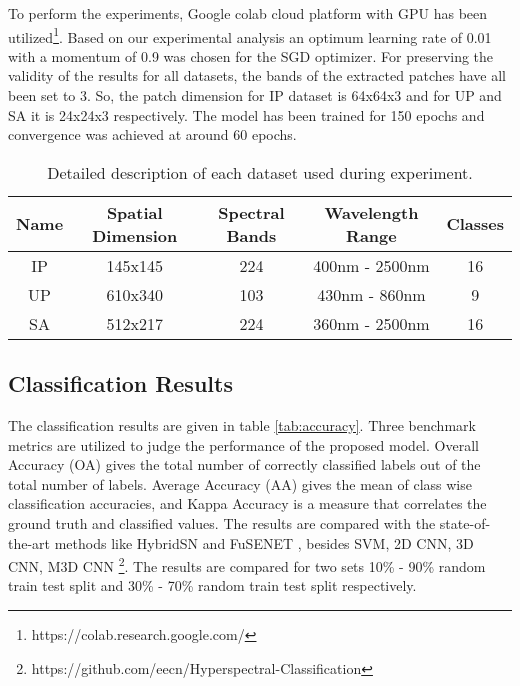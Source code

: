 \documentclass[journal]{IEEEtran}
\begin{document}
To perform the experiments, Google colab cloud platform with GPU has been utilized\footnote{https://colab.research.google.com/}. Based on our experimental analysis an optimum learning rate of 0.01 with a momentum of 0.9 was chosen for the SGD optimizer. For preserving the validity of the results for all datasets, the bands of the extracted patches have all been set to 3. So, the patch dimension for IP dataset is 64x64x3 and for UP and SA it is 24x24x3 respectively. The model has been trained for 150 epochs and convergence was achieved at around 60 epochs.


\begin{table}[]
    \centering
    \caption{Detailed description of each dataset used during experiment.}
    \begin{tabular}{c c c c c}
         Name & Spatial Dimension & Spectral Bands & Wavelength Range & Classes \\
         \hline
         IP & 145x145 & 224 & 400nm - 2500nm & 16 \\
         UP & 610x340 & 103 & 430nm - 860nm & 9 \\
         SA & 512x217 & 224 & 360nm - 2500nm & 16\\
         \hline
    \end{tabular}
    \label{tab:dataset}
\end{table}
\subsection{Classification Results}
The classification results are given in table \ref{tab:accuracy}. Three benchmark metrics are utilized to judge the performance of the proposed model. Overall Accuracy (OA) gives the total number of correctly classified labels out of the total number of labels. Average Accuracy (AA) gives the mean of class wise classification accuracies, and Kappa Accuracy is a measure that correlates the ground truth and classified values. The results are compared with the state-of-the-art methods like HybridSN \cite{8736016} and FuSENET \cite{iet:/content/journals/10.1049/iet-ipr.2019.1462}, besides SVM, 2D CNN, 3D CNN, M3D CNN \cite{8297014} \footnote{https://github.com/eecn/Hyperspectral-Classification}. The results are compared for two sets 10\% - 90\% random train test split and 30\% - 70\% random train test split respectively.
\end{document}
